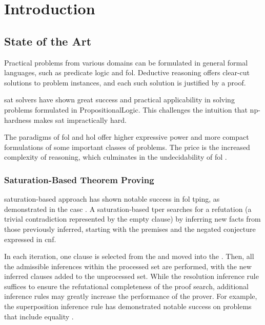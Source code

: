 

\chapter{Introduction}
\glsresetall

\section{State of the Art}
\label{sec:sota}

Practical problems from various domains can be formulated in general formal languages,
such as predicate logic and \gls{fol}.
Deductive reasoning offers clear-cut solutions to problem instances,
and each such solution is justified by a proof.

\Gls{sat} solvers have shown great success and practical applicability in solving problems formulated in \gls{PropositionalLogic}.
This challenges the intuition that \acrshort{np}-hardness makes \gls{sat} impractically hard.

The paradigms of \gls{fol} and \gls{hol} offer higher expressive power and more compact formulations of some important classes of problems.
The price is the increased complexity of reasoning,
which culminates in the undecidability of \gls{fol} \cite{}.

\subsection{Saturation-Based Theorem Proving}

\Gls{saturation}-based approach has shown notable success in \gls{fol} \gls{tping}, as demonstrated in the \gls{casc} \cite{Sut16}.
A \gls{saturation}-based \gls{tper} searches for a refutation
(a trivial contradiction represented by the empty clause)
by inferring new facts from those previously inferred,
starting with the premises and the negated conjecture expressed in \gls{cnf}.

In each iteration, one clause is selected from the  and moved into the .
Then, all the admissible inferences within the processed set are performed,
with the new inferred clauses added to the unprocessed set.
While the resolution inference rule suffices to ensure the refutational completeness of the proof search,
additional inference rules may greatly increase the performance of the prover.
For example, the superposition inference rule has demonstrated notable success on problems that include equality \cite{}.

